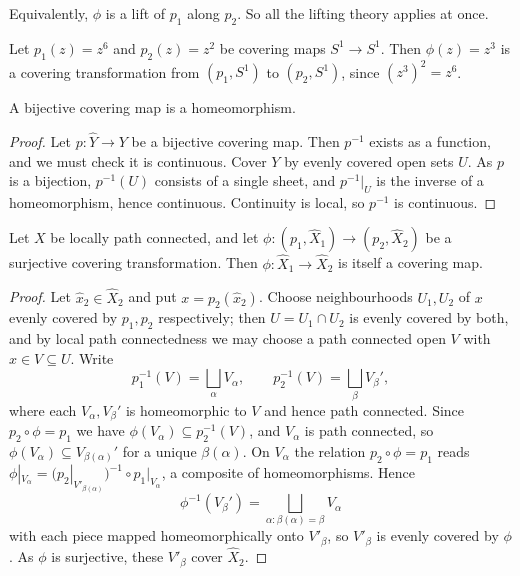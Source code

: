 \documentclass[a4paper]{scrartcl}
\begin{document}
Equivalently, $\phi$ is a lift of $p_1$ along $p_2$. So all the lifting theory applies at
once.

\begin{example}
	Let $p_1(z) = z^6$ and $p_2(z) = z^2$ be covering maps $S^1 \to S^1$. Then $\phi(z) = z^3$ is a covering transformation from $(p_1, S^1)$ to $(p_2, S^1)$, since $(z^3)^2 = z^6$.
\end{example}

\begin{lemma} \label{lem:bijective-cover}
	A bijective covering map is a homeomorphism.
\end{lemma}
\begin{proof}
	Let $p: \hat Y \to Y$ be a bijective covering map. Then $p^{-1}$ exists as a function, and we must check it is continuous. Cover $Y$ by evenly covered open sets $U$. As $p$ is a bijection, $p^{-1}(U)$ consists of a single sheet, and $p^{-1}|_U$ is the inverse of a homeomorphism, hence continuous. Continuity is local, so $p^{-1}$ is continuous.
\end{proof}

\begin{lemma} \label{lem:ct-is-cover}
	Let $X$ be locally path connected, and let $\phi: (p_1, \hat X_1) \to (p_2, \hat X_2)$ be a surjective covering transformation. Then $\phi: \hat X_1 \to \hat X_2$ is itself a covering map.
\end{lemma}
\begin{proof}
	Let $\hat x_2 \in \hat X_2$ and put $x = p_2(\hat x_2)$. Choose neighbourhoods $U_1, U_2$ of $x$ evenly covered by $p_1, p_2$ respectively; then $U = U_1 \cap U_2$ is evenly covered by both, and by local path connectedness we may choose a path connected open $V$ with $x \in V \subseteq U$. Write
	$$
	p_1^{-1}(V) = \bigsqcup_{\alpha} V_\alpha, \qquad p_2^{-1}(V) = \bigsqcup_\beta V_\beta',
	$$
	where each $V_\alpha, V_\beta'$ is homeomorphic to $V$ and hence path connected. Since $p_2 \circ \phi = p_1$ we have $\phi(V_\alpha) \subseteq p_2^{-1}(V)$, and $V_\alpha$ is path connected, so $\phi(V_\alpha) \subseteq V_{\beta(\alpha)}'$ for a unique $\beta(\alpha)$. On $V_\alpha$ the relation $p_2 \circ \phi = p_1$ reads $\phi|_{V_\alpha} = (p_2|_{V'_{\beta(\alpha)}})^{-1} \circ p_1|_{V_\alpha}$, a composite of homeomorphisms. Hence
	$$
	\phi^{-1}(V_\beta') = \bigsqcup_{\alpha : \beta(\alpha) = \beta} V_\alpha
	$$
	with each piece mapped homeomorphically onto $V'_\beta$, so $V'_\beta$ is evenly covered by $\phi$. As $\phi$ is surjective, these $V'_\beta$ cover $\hat X_2$.
\end{proof}
\end{document}
